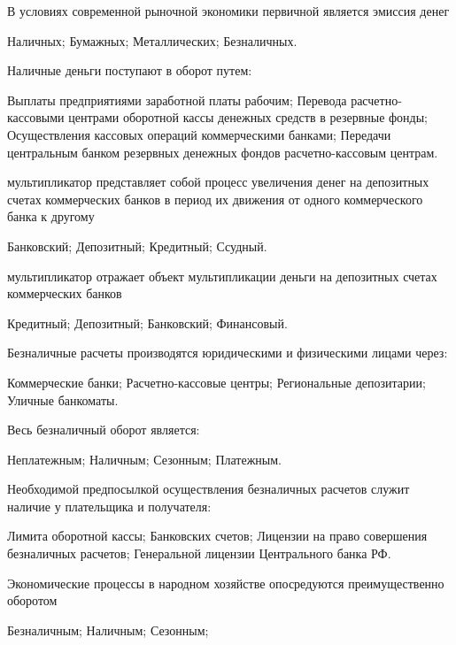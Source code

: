 \documentclass[12pt, table]{exam}
\begin{document}
\begin{questions}
\begin{multicols}{2}
\question В условиях современной рыночной экономики первичной является эмиссия денег
	 \begin{choices}
	 \choice Наличных;
	 \choice Бумажных;
	 \choice Металлических;
	 \CC Безналичных.
	 \end{choices}
\question Наличные деньги поступают в оборот путем:
	 \begin{choices}
	 \choice Выплаты предприятиями заработной платы рабочим;
	 \choice Перевода расчетно-кассовыми центрами оборотной кассы денежных средств в резервные фонды;
	 \CC Осуществления кассовых операций коммерческими банками;
	 \choice Передачи центральным банком резервных денежных фондов расчетно-кассовым центрам.
	 \end{choices}
\question  мультипликатор представляет собой процесс увеличения денег на депозитных счетах коммерческих банков в период их движения от одного коммерческого банка к другому
	 \begin{choices}
	 \CC Банковский;
	 \choice Депозитный;
	 \choice Кредитный;
	 \choice Ссудный.
	 \end{choices}
\question  мультипликатор отражает объект мультипликации  деньги на депозитных счетах коммерческих банков
	 \begin{choices}
	 \choice Кредитный;
	 \CC Депозитный;
	 \choice Банковский;
	 \choice Финансовый.
	 \end{choices}
\question Безналичные расчеты производятся юридическими и физическими лицами через:
	 \begin{choices}
	 \CC Коммерческие банки;
	 \choice Расчетно-кассовые центры;
	 \choice Региональные депозитарии;
	 \choice Уличные банкоматы.
	 \end{choices}
\question Весь безналичный оборот является:
	 \begin{choices}
	 \choice Неплатежным;
	 \choice Наличным;
	 \choice Сезонным;
	 \CC Платежным.
	 \end{choices}
\question Необходимой предпосылкой осуществления безналичных расчетов служит наличие у плательщика и получателя:
	 \begin{choices}
	 \choice Лимита оборотной кассы;
	 \CC Банковских счетов;
	 \choice Лицензии на право совершения безналичных расчетов;
	 \choice Генеральной лицензии Центрального банка РФ.
	 \end{choices}
\question Экономические процессы в народном хозяйстве опосредуются преимущественно  оборотом
	 \begin{choices}
	 \CC Безналичным;
	 \choice Наличным;
	 \choice Сезонным;

\end{choices}
\end{multicols}
\end{questions}
\end{document}
